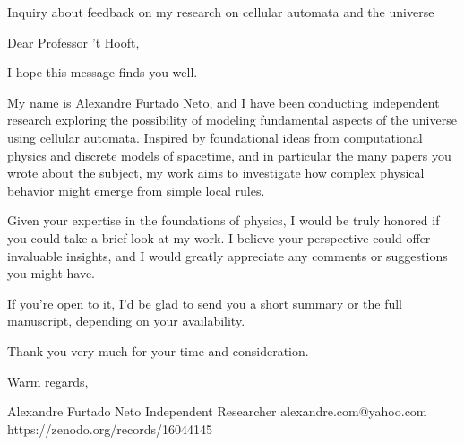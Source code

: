 Inquiry about feedback on my research on cellular automata and the universe

Dear Professor 't Hooft,

I hope this message finds you well.

My name is Alexandre Furtado Neto, and I have been conducting independent research exploring the possibility of modeling fundamental aspects of the universe using cellular automata. Inspired by foundational ideas from computational physics and discrete models of spacetime, and in particular the many papers you wrote about the subject, my work aims to investigate how complex physical behavior might emerge from simple local rules.

Given your expertise in the foundations of physics, I would be truly honored if you could take a brief look at my work. I believe your perspective could offer invaluable insights, and I would greatly appreciate any comments or suggestions you might have.

If you're open to it, I’d be glad to send you a short summary or the full manuscript, depending on your availability.

Thank you very much for your time and consideration.

Warm regards,

Alexandre Furtado Neto
Independent Researcher
alexandre.com@yahoo.com
https://zenodo.org/records/16044145